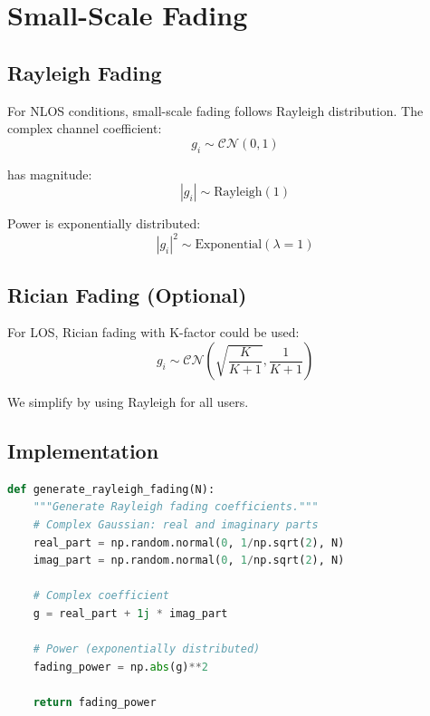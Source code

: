 \section{Small-Scale Fading}

\subsection{Rayleigh Fading}

For NLOS conditions, small-scale fading follows Rayleigh distribution. The complex channel coefficient:
\begin{equation}
g_i \sim \mathcal{CN}(0, 1)
\end{equation}

has magnitude:
\begin{equation}
|g_i| \sim \text{Rayleigh}(1)
\end{equation}

Power is exponentially distributed:
\begin{equation}
|g_i|^2 \sim \text{Exponential}(\lambda=1)
\end{equation}

\subsection{Rician Fading (Optional)}

For LOS, Rician fading with K-factor could be used:
\begin{equation}
g_i \sim \mathcal{CN}\left(\sqrt{\frac{K}{K+1}}, \frac{1}{K+1}\right)
\end{equation}

We simplify by using Rayleigh for all users.

\subsection{Implementation}

\begin{lstlisting}[language=Python, caption={Rayleigh Fading}]
def generate_rayleigh_fading(N):
    """Generate Rayleigh fading coefficients."""
    # Complex Gaussian: real and imaginary parts
    real_part = np.random.normal(0, 1/np.sqrt(2), N)
    imag_part = np.random.normal(0, 1/np.sqrt(2), N)
    
    # Complex coefficient
    g = real_part + 1j * imag_part
    
    # Power (exponentially distributed)
    fading_power = np.abs(g)**2
    
    return fading_power
\end{lstlisting}

